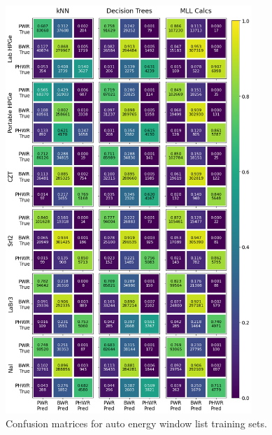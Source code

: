 \begin{figure}[H]
  \centering
  \includegraphics[width=0.83\textwidth]{./chapters/exp2/confusion_matrix_6dets_auto.png}
  \caption{Confusion matrices for auto energy window list training sets.}
  \label{fig:cm_auto}
\end{figure}

